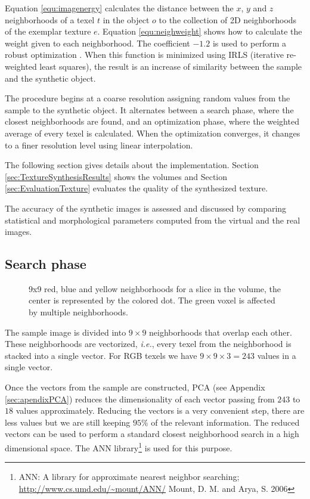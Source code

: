 Equation \ref{equ:imagenergy} calculates the distance between the $x$, $y$ and $z$ neighborhoods 
of a texel $t$ in the object $o$ to the collection of 2D neighborhoods of the exemplar texture $e$. 
Equation \ref{equ:neighweight} shows how to calculate the weight given to each neighborhood.
The coefficient $-1.2$ is used to perform a robust optimization \cite{kwatra:2005:SIGGRAPH}.
When this function is minimized using IRLS (iterative re-weighted least squares), 
the result is an increase of similarity between the sample and the synthetic object.

The procedure begins at a coarse resolution assigning random values from the sample to the synthetic object. 
It alternates between a search phase, where the closest neighborhoods are found,
and an optimization phase, where the weighted average of every texel is calculated. 
When the optimization converges, it changes to a finer resolution level using linear interpolation.

The following section gives details about the implementation.
Section \ref{sec:TextureSynthesisResults} shows the volumes and Section \ref{sec:EvaluationTexture}
evaluates the quality of the synthesized texture. 

The accuracy of the synthetic images is assessed and discussed by comparing statistical and morphological parameters computed from the virtual and the real images.

\subsection{Search phase}
\label{sec:SearchPhase}

\begin{figure}[!h]  
  \centering
  \caption[Texture synthesis neighborhoods.]{9x9 red, blue and yellow neighborhoods for a slice in the volume, the center is represented by the colored dot.
           The green voxel is affected by multiple neighborhoods.}
  \label{fig:search_phase}  
 \end{figure}

The sample image is divided into $9 \times 9$ neighborhoods that overlap each other. 
These neighborhoods are vectorized, \emph{i.e.},
every texel from the neighborhood is stacked into a single vector. 
For RGB texels we have $9 \times 9 \times 3 = 243$ values in a single vector. 

Once the vectors from the sample are constructed, PCA (see Appendix \ref{sec:apendixPCA})
reduces the dimensionality of each vector passing from $243$ to $18$ values approximately.
Reducing the vectors is a very convenient step, there are less values but we are still keeping $95\%$ of the relevant information.
The reduced vectors can be used to perform a standard closest neighborhood search in a high dimensional space. 
The ANN library\footnote{ANN: A library for approximate nearest neighbor searching; \url{http://www.cs.umd.edu/~mount/ANN/} Mount, D. M. and Arya, S. 2006}
is used for this purpose.

